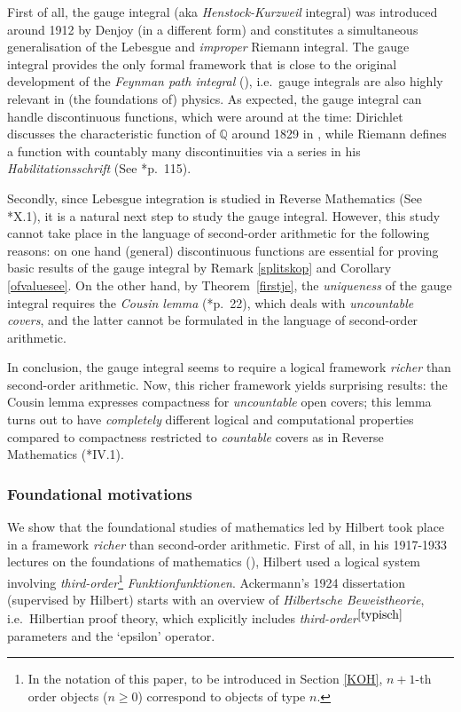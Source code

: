 \documentclass[reqno]{amsart}
\def\Q{{\mathbb  Q}}
\numberwithin{equation}{section}
\numberwithin{thm}{section}
\begin{document}
\smallskip

First of all, the gauge integral (aka \emph{Henstock-Kurzweil} integral) was introduced around 1912 by Denjoy (in a different form) and constitutes a simultaneous generalisation of the Lebesgue and \emph{improper} Riemann integral.  
The gauge integral provides the only formal framework that is close to the original development of the \emph{Feynman path integral} (\cite{mullingitover, burkdegardener}), i.e.\ gauge integrals are also highly relevant in (the foundations of) physics.   
As expected, the gauge integral can handle discontinuous functions, which were around at the time: Dirichlet discusses the characteristic function of $\Q$ around 1829 in \cite{didi1}, while Riemann defines a function with countably many discontinuities via a series in his \emph{Habilitationsschrift} 
(See \cite{kleine}*{p.\ 115}).  

\smallskip

Secondly, since Lebesgue integration is studied in Reverse Mathematics (See \cite{simpson2}*{X.1}), it is a natural next step to study the gauge integral.  
However, this study cannot take place in the language of second-order arithmetic for the following reasons: on one hand (general) discontinuous functions are essential for proving basic results of the gauge integral by Remark \ref{splitskop} and Corollary \ref{ofvaluesee}.  On the other hand, by Theorem~\ref{firstje}, the \emph{uniqueness} of the gauge integral requires the \emph{Cousin lemma} (\cite{cousin1}*{p.\ 22}), which deals with \emph{uncountable covers}, and the latter cannot be formulated in the language of second-order arithmetic.  

\smallskip

In conclusion, the gauge integral seems to require a logical framework \emph{richer} than second-order arithmetic.  
Now, this richer framework yields surprising results: the Cousin lemma expresses compactness for \emph{uncountable} open covers; this lemma turns out to have \emph{completely} different logical and computational properties compared to compactness restricted to \emph{countable} covers as in Reverse Mathematics (\cite{simpson2}*{IV.1}).


\subsubsection{Foundational motivations}\label{fomo}
We show that the foundational studies of mathematics led by Hilbert took place in a framework \emph{richer} than second-order arithmetic.
First of all, in his 1917-1933 lectures on the foundations of mathematics (\cite{hillebillen}), Hilbert used a logical system involving \emph{third-order}\footnote{In the notation of this paper, to be introduced in Section \ref{KOH}, $n+1$-th order objects ($n\geq 0$) correspond to objects of type $n$.\label{typisch}} \emph{Funktionfunktionen}.  Ackermann's 1924 dissertation (supervised by Hilbert) starts with an overview of \emph{Hilbertsche Beweistheorie}, i.e.\ Hilbertian proof theory, which explicitly includes \emph{third-order}$^{\ref{typisch}}$ parameters and the `epsilon' operator.  
\end{document}
